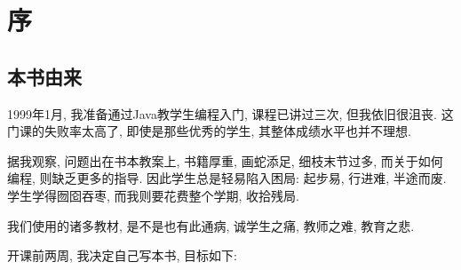 \documentclass[10pt]{book}
\begin{document}
\fi

\chapter{序}
\section*{本书由来}

1999年1月, 我准备通过Java教学生编程入门, 
课程已讲过三次, 但我依旧很沮丧. 
这门课的失败率太高了, 即使是那些优秀的学生, 
其整体成绩水平也并不理想.

据我观察, 问题出在书本教案上, 
书籍厚重, 画蛇添足, 细枝末节过多, 而关于如何编程, 则缺乏更多的指导.
因此学生总是轻易陷入困局: 起步易, 行进难, 半途而废.
学生学得囫囵吞枣, 而我则要花费整个学期, 收拾残局.

\begin{note}
我们使用的诸多教材, 是不是也有此通病, 诚学生之痛, 教师之难, 教育之悲. 
\end{note}

开课前两周, 我决定自己写本书, 目标如下: 
\end{document}
